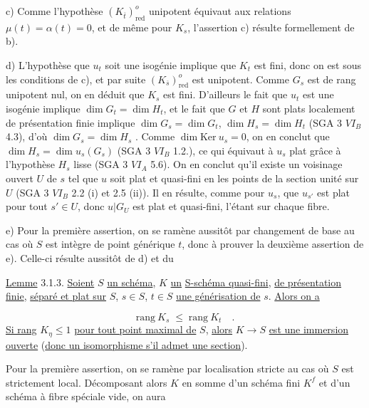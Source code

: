 c)   Comme l'hypothèse $(K_{\overline{t}})^{o}_{\mathrm{red}}$ unipotent équivaut aux relations $\mu(t) = \alpha(t) = 0$, et de même pour $K_{s}$, l'assertion c) résulte formellement de b).

d)   L'hypothèse que $u_{t}$ soit une isogénie implique que $K_{t}$ est fini, donc on est sous les conditions de c), et par suite $(K_{\overline{s}})^{o}_{\mathrm{red}}$ est unipotent. Comme $G_{s}$ est de rang unipotent nul, on en déduit que $K_{s}$ est fini. D'ailleurs le fait que $u_{t}$ est une isogénie implique $\dim G_{t} = \dim H_{t}$, et le fait que $G$ et $H$ sont plats localement de présentation finie implique $\dim G_{s} = \dim G_{t}$, $\dim H_{s} = \dim H_{t}$ (SGA 3 $VI_{B}$ 4.3), d'où $\dim G_{s} = \dim H_{s}$ . Comme $\dim \mathrm{Ker}\ u_{s} = 0$, on en conclut que $\dim H_{s} = \dim u_{s}(G_{s})$ (SGA 3 $VI_{B}$ 1.2.), ce qui équivaut à $u_{s}$ plat grâce à l'hypothèse $H_{s}$ lisse (SGA 3 $VI_{A}$ 5.6). On en conclut qu'il existe un voisinage ouvert $U$ de $s$ tel que $u$ soit plat et quasi-fini en les points de la section unité sur $U$ (SGA 3 $VI_{B}$ 2.2 (i) et 2.5 (ii)). Il en résulte, comme pour $u_{s}$, que $u_{s'}$ est plat pour tout $s' \in U$, donc $u|G_{U}$ est plat et quasi-fini, l'étant sur chaque fibre.

e)   Pour la première assertion, on se ramène aussitôt par changement de base au cas où $S$ est intègre de point générique $t$, donc à prouver la deuxième assertion de e). Celle-ci résulte aussitôt de d) et du



\underline{Lemme} 3.1.3. \underline{Soient} $S$ \underline{un schéma}, $K$ \underline{un} \underline{S-schéma quasi-fini}, \underline{de présentation finie}, \underline{séparé et plat sur} $S$, $s \in S$, $t \in S$ \underline{une générisation de} $s$. \underline{Alors on a}

\begin{equation*}
\mathrm{rang}\ K_{s} \;\leq\; \mathrm{rang}\ K_{t} \quad .
\end{equation*}
\underline{Si rang} $K_{\eta} \leq 1$ \underline{pour tout point maximal de} $S$, \underline{alors} $K \longrightarrow S$ \underline{est une immersion ouverte} (\underline{donc un isomorphisme s'il admet une section}).

Pour la première assertion, on se ramène par localisation stricte au cas où $S$ est strictement local. Décomposant alors $K$ en somme d'un schéma fini $K^{f}$ et d'un schéma à fibre spéciale vide, on aura

